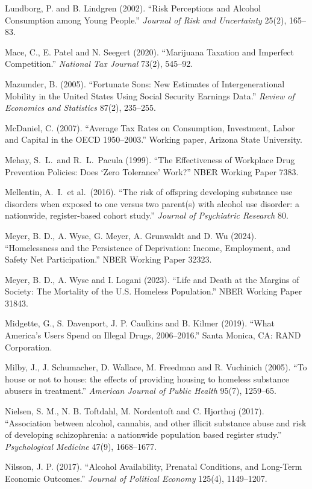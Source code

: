 \documentclass[10pt]{article}
\begin{document}
{\begin{list}{}{\setlength{\leftmargin}{1.5em}\setlength{\itemindent}{-1.5em}\setlength{\itemsep}{0.35em}\setlength{\parsep}{0em}}
\item Lundborg, P. and B. Lindgren (2002). ``Risk Perceptions and Alcohol Consumption among Young People.'' \emph{Journal of Risk and Uncertainty} 25(2), 165--83.
\item Mace, C., E. Patel and N. Seegert (2020). ``Marijuana Taxation and Imperfect Competition.'' \emph{National Tax Journal} 73(2), 545--92.
\item Mazumder, B. (2005). ``Fortunate Sons: New Estimates of Intergenerational Mobility in the United States Using Social Security Earnings Data.'' \emph{Review of Economics and Statistics} 87(2), 235--255.
\item McDaniel, C. (2007). ``Average Tax Rates on Consumption, Investment, Labor and Capital in the OECD 1950--2003.'' Working paper, Arizona State University.
\item Mehay, S.\ L.\ and R.\ L.\ Pacula (1999). ``The Effectiveness of Workplace Drug Prevention Policies: Does `Zero Tolerance' Work?'' NBER Working Paper 7383.
\item Mellentin, A.\ I.\ et al.\ (2016). ``The risk of offspring developing substance use disorders when exposed to one versus two parent(s) with alcohol use disorder: a nationwide, register-based cohort study.'' \emph{Journal of Psychiatric Research} 80.
\item Meyer, B. D., A. Wyse, G. Meyer, A. Grunwaldt and D. Wu (2024). ``Homelessness and the Persistence of Deprivation: Income, Employment, and Safety Net Participation.'' NBER Working Paper 32323.
\item Meyer, B. D., A. Wyse and I. Logani (2023). ``Life and Death at the Margins of Society: The Mortality of the U.S. Homeless Population.'' NBER Working Paper 31843.
\item Midgette, G., S. Davenport, J. P. Caulkins and B. Kilmer (2019). ``What America's Users Spend on Illegal Drugs, 2006--2016.'' Santa Monica, CA: RAND Corporation.
\item Milby, J., J. Schumacher, D. Wallace, M. Freedman and R. Vuchinich (2005). ``To house or not to house: the effects of providing housing to homeless substance abusers in treatment.'' \emph{American Journal of Public Health} 95(7), 1259--65.
\item Nielsen, S. M., N. B. Toftdahl, M. Nordentoft and C. Hjorthoj (2017). ``Association between alcohol, cannabis, and other illicit substance abuse and risk of developing schizophrenia: a nationwide population based register study.'' \emph{Psychological Medicine} 47(9), 1668--1677.
\item Nilsson, J. P. (2017). ``Alcohol Availability, Prenatal Conditions, and Long-Term Economic Outcomes.'' \emph{Journal of Political Economy} 125(4), 1149--1207.

\end{list}}
\end{document}
